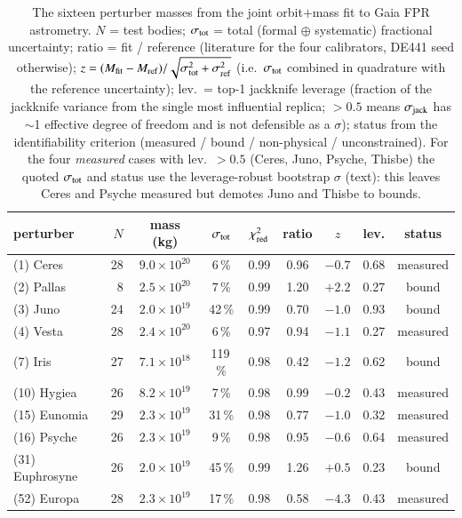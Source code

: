 \documentclass{aa}
\begin{document}
\begin{table}
\caption{The sixteen perturber masses from the joint orbit$+$mass fit to Gaia FPR
astrometry. $N$ = test bodies; $\sigma_{\rm tot}$ = total (formal $\oplus$
systematic) fractional uncertainty; ratio = fit / reference (literature for the
four calibrators, DE441 seed otherwise); $z = (M_{\rm fit}-M_{\rm ref})/\sqrt{\sigma_{\rm tot}^2+\sigma_{\rm ref}^2}$
(i.e.\ $\sigma_{\rm tot}$ combined in quadrature with the reference uncertainty); lev.\ =
top-1 jackknife leverage (fraction of the jackknife variance from the single most
influential replica; $>0.5$ means $\sigma_{\rm jack}$ has $\sim$1 effective
degree of freedom and is not defensible as a $\sigma$); status from the
identifiability criterion (measured / bound / non-physical / unconstrained). For
the four \emph{measured} cases with lev.\ $>0.5$ (Ceres, Juno, Psyche, Thisbe) the
quoted $\sigma_{\rm tot}$ and status use the leverage-robust bootstrap $\sigma$
(text): this leaves Ceres and Psyche measured but demotes Juno and Thisbe to
bounds.}
\label{tab:sixteen}
\centering
\small
\begin{tabular}{lrccccccc}
\hline\hline
perturber & $N$ & mass (kg) & $\sigma_{\rm tot}$ & $\chi^2_{\rm red}$ & ratio & $z$ & lev. & status \\
\hline
(1) Ceres        & 28 & $9.0\times10^{20}$  & 6\,\%   & 0.99 & 0.96 & $-0.7$ & 0.68 & measured \\
(2) Pallas       &  8 & $2.5\times10^{20}$  & 7\,\%   & 0.99 & 1.20 & $+2.2$ & 0.27 & bound \\
(3) Juno         & 24 & $2.0\times10^{19}$  & 42\,\%  & 0.99 & 0.70 & $-1.0$ & 0.93 & bound \\
(4) Vesta        & 28 & $2.4\times10^{20}$  & 6\,\%   & 0.97 & 0.94 & $-1.1$ & 0.27 & measured \\
(7) Iris         & 27 & $7.1\times10^{18}$  & 119\,\% & 0.98 & 0.42 & $-1.2$ & 0.62 & bound \\
(10) Hygiea      & 26 & $8.2\times10^{19}$  & 7\,\%   & 0.98 & 0.99 & $-0.2$ & 0.43 & measured \\
(15) Eunomia     & 29 & $2.3\times10^{19}$  & 31\,\%  & 0.98 & 0.77 & $-1.0$ & 0.32 & measured \\
(16) Psyche      & 26 & $2.3\times10^{19}$  & 9\,\%   & 0.98 & 0.95 & $-0.6$ & 0.64 & measured \\
(31) Euphrosyne  & 26 & $2.0\times10^{19}$  & 45\,\%  & 0.99 & 1.26 & $+0.5$ & 0.23 & bound \\
(52) Europa      & 28 & $2.3\times10^{19}$  & 17\,\%  & 0.98 & 0.58 & $-4.3$ & 0.43 & measured \\

\end{tabular}
\end{table}
\end{document}
